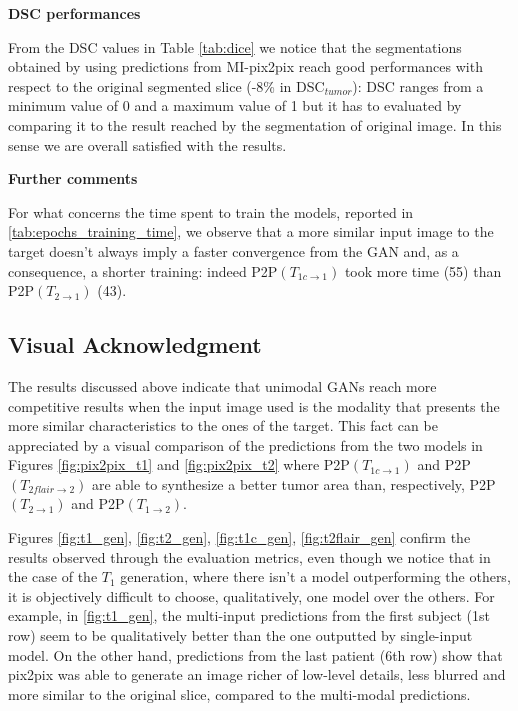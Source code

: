 \vspace{6mm} 
\noindent\textbf{DSC performances}

\vspace{2mm}
\noindent From the DSC values in Table \ref{tab:dice} we notice that the segmentations obtained by using predictions from MI-pix2pix reach good performances with respect to the original segmented slice (-8\% in DSC$_{tumor}$): DSC ranges from a minimum value of 0 and a maximum value of 1 but it has to evaluated by comparing it to the result reached by the segmentation of original image. In this sense we are overall satisfied with the results.

\vspace{6mm} 
\noindent\textbf{Further comments}

\vspace{2mm}
\noindent For what concerns the time spent to train the models, reported in \ref{tab:epochs_training_time}, we observe that a more similar input image to the target doesn't always imply a faster convergence from the \ac{GAN} and, as a consequence, a shorter training: indeed P2P$(T_{1c \rightarrow 1})$ took more time (55) than P2P$(T_{2 \rightarrow 1})$ (43).


\subsection{Visual Acknowledgment}
\label{subsec:visual_acknowledgment}

\vspace{5mm} %
The results discussed above indicate that unimodal \ac{GAN}s reach more competitive results when the input image used is the modality that presents the more similar characteristics to the ones of the target. This fact can be appreciated by a visual comparison of the predictions from the two models in Figures \ref{fig:pix2pix_t1} and \ref{fig:pix2pix_t2} where P2P$(T_{1c \rightarrow 1})$ and P2P$(T_{2flair \rightarrow 2})$ are able to synthesize a better tumor area than, respectively, P2P$(T_{2 \rightarrow 1})$ and P2P$(T_{1 \rightarrow 2})$.

\vspace{5mm} %
Figures \ref{fig:t1_gen}, \ref{fig:t2_gen}, \ref{fig:t1c_gen}, \ref{fig:t2flair_gen} confirm the results observed through the evaluation metrics, even though we notice that in the case of the $T_{1}$ generation, where there isn't a model outperforming the others, it is objectively difficult to choose, qualitatively, one model over the others.
For example, in \ref{fig:t1_gen}, the multi-input predictions from the first subject (1st row) seem to be qualitatively better than the one outputted by single-input model. On the other hand, predictions from the last patient (6th row) show that pix2pix was able to generate an image richer of low-level details, less blurred and more similar to the original slice, compared to the multi-modal predictions. 

